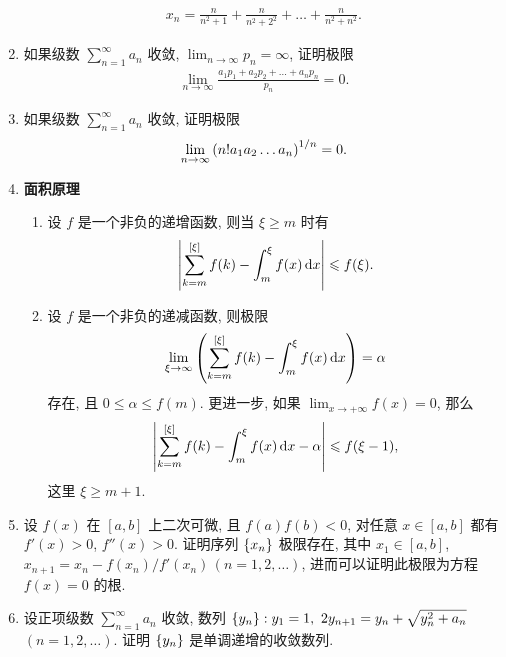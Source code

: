 \documentclass{ctexart}
\let\set\qty
\let\ge\geqslant
\let\le\leqslant
\newcommand{\limit}[2]{\lim_{#1 \to #2}}
\begin{document}
\begin{enumerate}[series=exer]
    \begin{align*}
        x_{n} = \frac{n}{n^{2} + 1} + \frac{n}{n^{2} + 2^{2}} + \dots + \frac{n}{n^{2} + n^{2}}.
    \end{align*}
    \item 如果级数 $ \sum_{n = 1}^{\infty} a_{n} $ 收敛, $ \limit{n}{\infty} p_{n} = \infty $, 证明极限
    \begin{align*}
        \limit{n}{\infty}\frac{a_{1} p_{1} + a_{2} p_{2} + \dots + a_{n} p_{n}}{p_{n}} = 0.
    \end{align*}
    \item 如果级数 $ \sum_{n = 1}^{\infty} a_{n} $ 收敛, 证明极限
    \begin{align*}
        \limit{n}{\infty}\qty(n! a_{1} a_{2} \dots a_{n})^{1/n} = 0.
    \end{align*}
    \item \textbf{面积原理}
    \begin{enumerate}
        \item 设 $ f $ 是一个非负的递增函数, 则当 $ \xi \ge m $ 时有
        \begin{align*}
            \abs{\sum_{k = m}^{[\xi]} f(k) - \int_{m}^{\xi} f(x) \dd{x}} \le f(\xi).
        \end{align*}
        \item 设 $ f $ 是一个非负的递减函数, 则极限
        \begin{align*}
            \limit{\xi}{\infty} \qty(\sum_{k = m}^{[\xi]} f(k) - \int_{m}^{\xi} f(x) \dd{x}) = \alpha
        \end{align*}
        存在, 且 $ 0 \le \alpha \le f(m) $. 更进一步, 如果 $ \limit{x}{+\infty} f(x) = 0 $, 那么
        \begin{align*}
            \abs{\sum_{k = m}^{[\xi]} f(k) - \int_{m}^{\xi} f(x) \dd{x} - \alpha} \le f(\xi - 1),
        \end{align*} 
        这里 $ \xi \ge m + 1 $. 
    \end{enumerate}
    \item 设 $ f(x) $ 在 $ [a, b] $ 上二次可微, 且 $ f(a)f(b) < 0 $, 对任意 $ x \in [a, b] $ 都有 $ f'(x) > 0 $, $ f''(x) > 0 $. 证明序列 $ \set{x_{n}} $ 极限存在, 其中 $ x_{1} \in [a, b] $, $ x_{n + 1} = x_{n} - f(x_{n})/f'(x_{n})\,(n = 1, 2, \dots) $, 进而可以证明此极限为方程 $ f(x) = 0 $ 的根. 
    \item 设正项级数 $ \sum_{n = 1}^{\infty} a_{n} $ 收敛, 数列 $ \set{y_{n}} : y_{1} = 1,\ 2y_{n + 1} = y_{n} + \sqrt{y_{n}^{2} + a_{n}} $\, $ (n = 1, 2, \dots) $. 证明 $ \set{y_{n}} $ 是单调递增的收敛数列. 

\end{enumerate}
\end{document}

